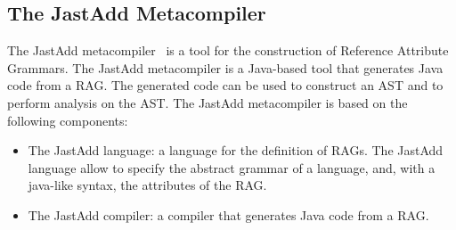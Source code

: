 \subsection{The JastAdd Metacompiler}
\label{sec:jastadd}
The JastAdd metacompiler~\cite{DBLP:journals/entcs/HedinM01} is a tool for the construction of
Reference Attribute Grammars. The JastAdd metacompiler is a Java-based tool that generates
Java code from a RAG. The generated code can be used to construct an AST and to perform
analysis on the AST.
The JastAdd metacompiler is based on the following components:
\begin{itemize}
    \item The JastAdd language: a language for the definition of RAGs. 
    The JastAdd language allow to specify the abstract grammar of a language, and,
    with a java-like syntax, the attributes of the RAG.
    \item The JastAdd compiler: a compiler that generates Java code from a RAG.
\end{itemize}

